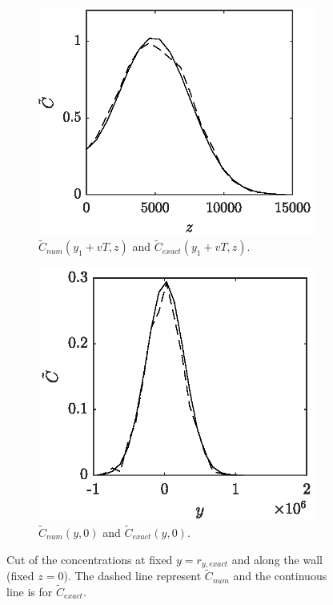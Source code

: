 \begin{figure}[H]
	\centering
	\begin{subfigure}[b]{0.49\textwidth}
		\includegraphics[width=\textwidth]{fig/testcase/testcaseSI_fixedy.eps}
		\caption{$\tilde C_{num}(y_1+vT,z)$ and $\tilde C_{exact}(y_1+vT,z)$.}
		\label{fig:testcaseSI_fixedy}
	\end{subfigure}
	\begin{subfigure}[b]{0.49\textwidth}
		\includegraphics[width=\textwidth]{fig/testcase/testcaseSI_fixedz.eps}
		\caption{$\tilde C_{num}(y,0)$ and $\tilde C_{exact}(y,0)$.}
		\label{fig:testcaseSI_fixedz}
	\end{subfigure}
	\caption{Cut of the concentrations at fixed $y = r_{y,exact}$ and along the wall (fixed $z = 0$). The dashed line represent $\tilde C_{num}$ and the continuous line is for $\tilde C_{exact}$.}
\end{figure}